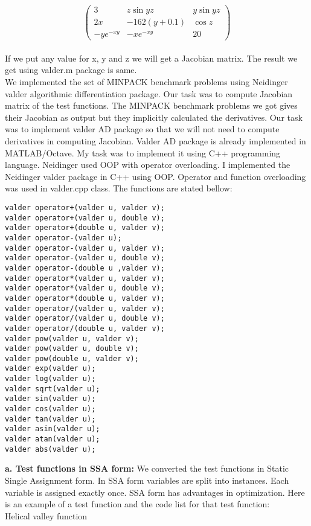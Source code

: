 \documentclass[paper=letter, fontsize=12pt]{scrartcl} %
\begin{document}
\[ \left( \begin{array}{ccc}
3 & z\sin yz & y\sin yz \\
2x & -162(y+0.1) & \cos z \\
-ye^{-xy} & -xe^{-xy} & 20 \end{array} \right)\] \\
If we put any value for x, y and z we will get a Jacobian matrix. The result we get using valder.m package is same.\\ 
\newline
\pagebreak
\newpage We implemented the set of MINPACK benchmark problems using  Neidinger valder algorithmic differentiation package. Our task was to compute Jacobian matrix of the test functions. The MINPACK benchmark problems we got gives their Jacobian as output but they implicitly calculated the derivatives. Our task was to implement valder AD package so that we will not need to compute derivatives in computing Jacobian. Valder AD package is already implemented in MATLAB/Octave. My task was to implement it using C++ programming language. Neidinger used OOP with operator overloading. I implemented the Neidinger valder package in C++ using OOP. Operator and function overloading was used in valder.cpp class. The functions are stated bellow: 
\begin{lstlisting}
valder operator+(valder u, valder v);
valder operator+(valder u, double v);
valder operator+(double u, valder v);
valder operator-(valder u);
valder operator-(valder u, valder v);
valder operator-(valder u, double v);
valder operator-(double u ,valder v);
valder operator*(valder u, valder v);
valder operator*(valder u, double v);
valder operator*(double u, valder v);
valder operator/(valder u, valder v);
valder operator/(valder u, double v);
valder operator/(double u, valder v);
valder pow(valder u, valder v);
valder pow(valder u, double v);
valder pow(double u, valder v);
valder exp(valder u);
valder log(valder u);
valder sqrt(valder u);
valder sin(valder u);
valder cos(valder u);
valder tan(valder u);
valder asin(valder u);
valder atan(valder u);
valder abs(valder u);
\end{lstlisting}
\textbf{a. Test functions in SSA form: } We converted the test functions in Static Single Assignment form. In SSA form variables are split into instances. Each variable is assigned exactly once. SSA form has advantages in optimization. Here is an example of a test function and the code list for that test function:\\  
Helical valley function\\
\end{document}
